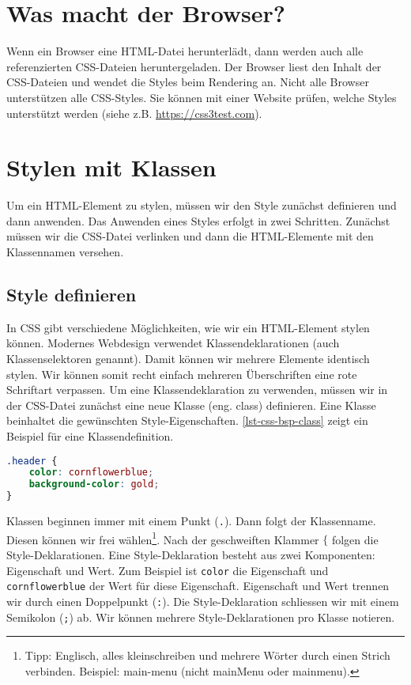 \section{Was macht der Browser?}

Wenn ein Browser eine HTML-Datei herunterlädt, dann werden auch alle referenzierten CSS-Dateien heruntergeladen. Der Browser liest den Inhalt der CSS-Dateien und wendet die Styles beim Rendering an. Nicht alle Browser unterstützen alle CSS-Styles. Sie können mit einer Website prüfen, welche Styles unterstützt werden (siehe z.B. \url{https://css3test.com}).

\section{Stylen mit Klassen}

Um ein \ac{HTML}-Element zu stylen, müssen wir den Style zunächst definieren und dann anwenden. Das Anwenden eines Styles erfolgt in zwei Schritten. Zunächst müssen wir die \ac{CSS}-Datei verlinken und dann die \ac{HTML}-Elemente mit den Klassennamen versehen.

\subsection{Style definieren}

In \ac{CSS} gibt verschiedene Möglichkeiten, wie wir ein \ac{HTML}-Element stylen können. Modernes Webdesign verwendet Klassendeklarationen (auch Klassenselektoren genannt). Damit können wir mehrere Elemente identisch stylen. Wir können somit recht einfach mehreren Überschriften eine rote Schriftart verpassen. Um eine Klassendeklaration zu verwenden, müssen wir in der \ac{CSS}-Datei zunächst eine neue Klasse (eng. class) definieren. Eine Klasse beinhaltet die gewünschten Style-Eigenschaften. \autoref{lst-css-bsp-class} zeigt ein Beispiel für eine Klassendefinition.

\begin{lstlisting}[language=CSS, caption={Klassendefinition in der Datei \texttt{style.css}.}, label={lst-css-bsp-class}]
.header {
    color: cornflowerblue;
    background-color: gold;
}	
\end{lstlisting}

Klassen beginnen immer mit einem Punkt (\lstinline{.}). Dann folgt der Klassenname. Diesen können wir frei wählen\footnote{Tipp: Englisch, alles kleinschreiben und mehrere Wörter durch einen Strich verbinden. Beispiel: main-menu (nicht mainMenu oder mainmenu).}. Nach der geschweiften Klammer $\{$ folgen die Style-Deklarationen. Eine Style-Deklaration besteht aus zwei Komponenten: Eigenschaft und Wert. Zum Beispiel ist \lstinline{color} die Eigenschaft und \lstinline{cornflowerblue} der Wert für diese Eigenschaft. Eigenschaft und Wert trennen wir durch einen Doppelpunkt (\lstinline{:}). Die Style-Deklaration schliessen wir mit einem Semikolon (\lstinline{;}) ab. Wir können mehrere Style-Deklarationen pro Klasse notieren.

